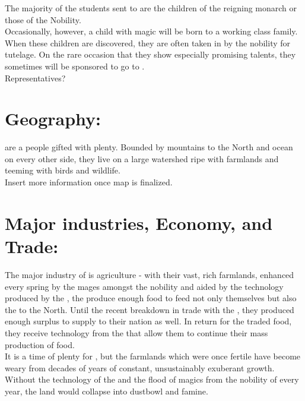 \documentclass[blue]{GL2020}
\begin{document}
The majority of the students sent to \pSchool{} are the children of the reigning monarch or those of the Nobility.\\

Occasionally, however, a child with magic will be born to a working class family.  When these children are discovered, they are often taken in by the nobility for tutelage.  On the rare occasion that they show especially promising talents, they sometimes will be sponsored to go to \pSchool{}.\\

Representatives?\\

\section{Geography:}

\pSunCh{} are a people gifted with plenty.  Bounded by mountains to the North and ocean on every other side, they live on a large watershed ripe with farmlands and teeming with birds and wildlife. \\ 

Insert more information once map is finalized.\\

\section{Major industries, Economy, and Trade:}

The major industry of \pSun{} is agriculture - with their vast, rich farmlands, enhanced every spring by the mages amongst the nobility and aided by the technology produced by the \pCreators{}, the \pSunCh{} produce enough food to feed not only themselves but also the \pCreators{} to the North.  Until the recent breakdown in trade with the \pViking{}, they produced enough surplus to supply to their nation as well.  In return for the traded food, they receive technology from the \pCreators{} that allow them to continue their mass production of food.\\

It is a time of plenty for \pSunCh{}, but the farmlands which were once fertile have become weary from decades of years of constant, unsustainably exuberant growth.  Without the technology of the \pCreators{} and the flood of magics from the nobility of \pSun{} every year, the land would collapse into dustbowl and famine.\\
\end{document}
